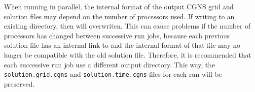 
\NOTE
When running in parallel, the internal format of the output CGNS grid and
solution files may depend on the number of processors used.
%
If writing to an existing directory, then 
will overwriten.
%
This can cause problems if the number of processors has changed between
successive run jobs, because each previous solution file has an internal
link to  and the internal format of that file
may no longer be compatible with the old solution file.
%
Therefore, it is recommended that each successive run job use a different
output directory.
%
This way, the {\tt solution.grid.cgns} and {\tt solution.time.cgns} files
for each run will be preserved.






